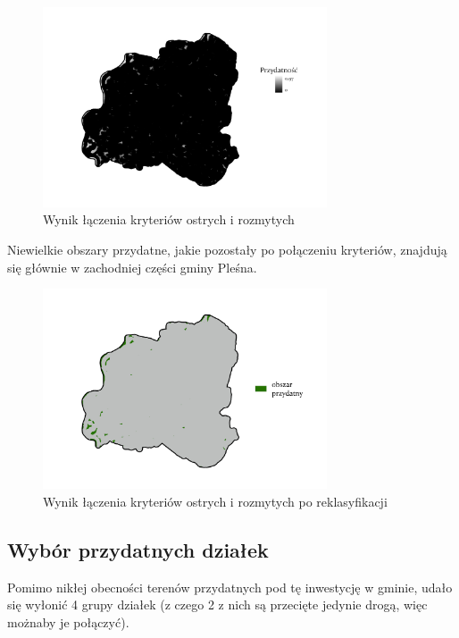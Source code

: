 \documentclass{article}
\begin{document}
\begin{figure}[H]
    \centering
    \includegraphics[width=0.75\textwidth]{img/plesna-wynik.jpg}
    \caption{Wynik łączenia kryteriów ostrych i rozmytych}
\end{figure}

Niewielkie obszary przydatne, jakie pozostały po połączeniu kryteriów, znajdują się głównie w zachodniej części gminy Pleśna.

\begin{figure}[H]
    \centering
    \includegraphics[width=0.75\textwidth]{img/plesna-wynik-po-reklasyfikacji.jpg}
    \caption{Wynik łączenia kryteriów ostrych i rozmytych po reklasyfikacji}
\end{figure}

\subsection{Wybór przydatnych działek}

Pomimo nikłej obecności terenów przydatnych pod tę inwestycję w gminie, udało się wyłonić 4 grupy działek (z czego 2 z nich są przecięte jedynie drogą, więc możnaby je połączyć).
\end{document}
